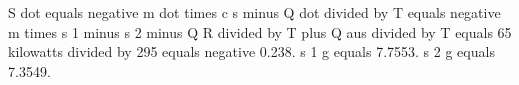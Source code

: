 S dot equals negative m dot times c s minus Q dot divided by T equals negative m times s 1 minus s 2 minus Q R divided by T plus Q aus divided by T equals 65 kilowatts divided by 295 equals negative 0.238. s 1 g equals 7.7553. s 2 g equals 7.3549.